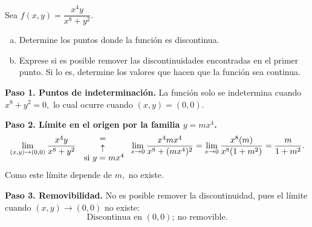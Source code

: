 \begin{prob}
Sea $f(x,y)=\dfrac{x^4y}{x^8+y^2}.$
\begin{enumerate}[(a)]
    \item Determine los puntos donde la función es discontinua.
    \item Exprese si es posible remover las discontinuidades encontradas en el primer punto. Si lo es, determine los valores que hacen que la función sea continua. 
\end{enumerate}
\begin{myproof}
\textbf{Paso 1. Puntos de indeterminación.} La función solo se indetermina cuando $x^8+y^2=0,$ lo cual ocurre cuando $(x,y)=(0,0).$

\textbf{Paso 2. Límite en el origen por la familia $y=mx^4$.}
 \begin{align*}
\displaystyle\lim_{(x,y)\to (0,0)} \dfrac{x^4y}{x^8+y^2} {{=}\atop {\begin{array}{c}
\uparrow\\ \text{ si $y=mx^4$}\end{array}} } \displaystyle\lim_{x\to 0}\dfrac{x^4mx^4}{x^8+(mx^4)^2}=\displaystyle\lim_{x\to 0}\dfrac{x^8(m)}{x^8(1+m^2)}=\displaystyle\dfrac{m}{1+m^2}.
\end{align*}
Como este límite depende de $m,$ no existe.

\textbf{Paso 3. Removibilidad.} No es posible remover la discontinuidad, pues el límite cuando $(x,y)\to(0,0)$ no existe:
\[
\boxed{\text{Discontinua en } (0,0);\ \text{no removible.}}
\]
\end{myproof}
\end{prob}

